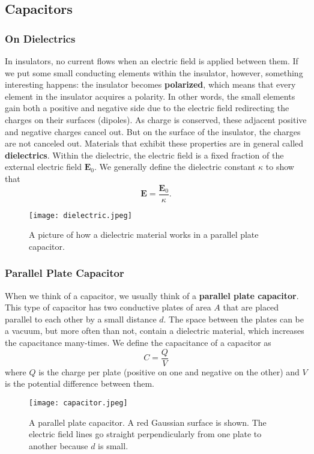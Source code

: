 \documentclass[12pt]{article}
\let\vec\mathbf
\begin{document}
  \subsection{Capacitors}
  \subsubsection{On Dielectrics}
  In insulators, no current flows when an electric field is applied between them. If we put some small conducting elements within the insulator, however, something interesting happens: the insulator becomes \textbf{polarized}, which means that every element in the insulator acquires a polarity. In other words, the small elements gain both a positive and negative side due to the electric field redirecting the charges on their surfaces (dipoles). As charge is conserved, these adjacent positive and negative charges cancel out. But on the surface of the insulator, the charges are not canceled out. Materials that exhibit these properties are in general called \textbf{dielectrics}. Within the dielectric, the electric field is a fixed fraction of the external electric field $\vec E_0$. We generally define the dielectric constant $\kappa$ to show that 
  \[\vec E = \frac{\vec E_0}{\kappa}.\]
  \begin{figure}[H]
  \centering
      \texttt{[image: dielectric.jpeg]}
      \caption{A picture of how a dielectric material works in a parallel plate capacitor.}
  \end{figure}
  \subsubsection{Parallel Plate Capacitor}
  When we think of a capacitor, we usually think of a \textbf{parallel plate capacitor}. This type of capacitor has two conductive plates of area $A$ that are placed parallel to each other by a small distance $d$. The space between the plates can be a vacuum, but more often than not, contain a dielectric material, which increases the capacitance many-times. We define the capacitance of a capacitor as 
  \[C = \frac{Q}{V}\]
  where $Q$ is the charge per plate (positive on one and negative on the other) and $V$ is the potential difference between them. 
  \begin{figure}[H]
  \centering
      \texttt{[image: capacitor.jpeg]}
      \caption{A parallel plate capacitor. A red Gaussian surface is shown. The electric field lines go straight perpendicularly from one plate to another because $d$ is small.}
  \end{figure}
  
\end{document}
